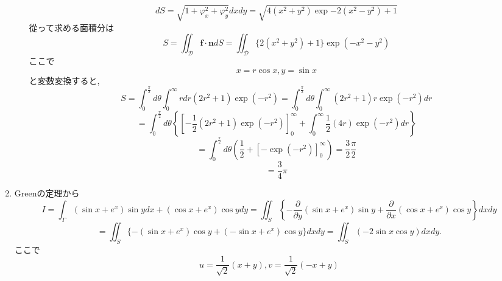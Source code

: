 \documentclass[a4paper,10pt,report]{amsart}
\theoremstyle{plain}
\theoremstyle{definition}
\theoremstyle{remark}
\begin{document}
\begin{enumerate}
\begin{enumerate}
\begin{equation*}
                dS=\sqrt{1+\varphi_{x}^{2}+\varphi_{y}^{2}}dxdy=\sqrt{4(x^{2}+y^{2})\exp{-2(x^{2}-y^{2})}+1}
            \end{equation*}
            從って求める面積分は
            \begin{equation*}
            S=\iint_{\mathcal{D}}\bm{f}\cdot\bm{n}dS=\iint_{\mathcal{D}}\{2(x^{2}+y^{2})+1\}\exp(-x^{2}-y^{2})
            \end{equation*}
            ここで
            \begin{equation*}
                x=r\cos{x},y=\sin{x}
            \end{equation*}
            と変数変換すると, 
            \begin{equation*}
                S=\int_{0}^{\frac{\pi}{2}}d\theta\int_{0}^{\infty}rdr(2r^{2}+1)\exp{(-r^{2})}=\int_{0}^{\frac{\pi}{2}}d\theta\int_{0}^{\infty}(2r^{2}+1)r\exp(-r^{2})dr
            \end{equation*}
            \begin{equation*}
                =\int_{0}^{\frac{\pi}{2}}d\theta\left\{{\left[-\frac{1}{2}(2r^{2}+1)\exp(-r^{2})\right]}_{0}^{\infty}+\int_{0}^{\infty}\frac{1}{2}(4r)\exp(-r^{2})dr\right\}
            \end{equation*}
            \begin{equation*}
                =\int_{0}^{\frac{\pi}{2}}d\theta\left(\frac{1}{2}+{[-\exp(-r^{2})]}_{0}^{\infty}\right)=\frac{3}{2}\frac{\pi}{2}
            \end{equation*}
            \begin{equation*}
                =\frac{3}{4}\pi
            \end{equation*}
        \end{enumerate}
        \item Greenの定理から
        \begin{equation*}
            I=\int_{\Gamma}(\sin{x}+e^{x})\sin{y}dx+(\cos{x}+e^{x})\cos{y}dy=\iint_{S}\left \{-\frac{\partial}{\partial y}(\sin{x}+e^{x})\sin{y}+\frac{\partial}{\partial x}(\cos{x}+e^{x})\cos{y}\right \}dxdy
        \end{equation*}
        \begin{equation*}
            =\iint_{S}\{-(\sin{x}+e^{x})\cos{y}+(-\sin{x}+e^{x})\cos{y}\}dxdy=\iint_{S}(-2\sin{x}\cos{y})dxdy. 
        \end{equation*}
        ここで
        \begin{equation*}
            u=\frac{1}{\sqrt{2}}(x+y),v=\frac{1}{\sqrt{2}}(-x+y)
        \end{equation*}

\end{enumerate}
\end{document}
